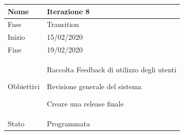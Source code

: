 \begin{center}
\begin{tabular}{ |p{2cm}|p{10cm}|  }
\hline
Nome & Iterazione 8 \\\hline
Fase & Transition \\\hline
Inizio & 15/02/2020 \\\hline
Fine &  19/02/2020  \\\hline
Obbiettivi & 
	\begin{compactitem}
		\item Raccolta Feedback di utilizzo degli utenti
		\item Revisione generale del sistema
		\item Creare una release finale
	\end{compactitem}\\\hline
Stato &  Programmata \\\hline
\end{tabular}
\label{table:8}\newline


\end{center}